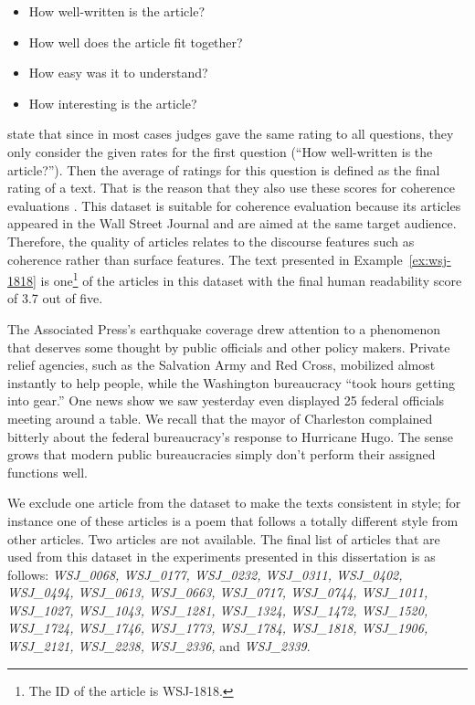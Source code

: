 \begin{itemize}
    \item How well-written is the article?
    \item How well does the article fit together?
    \item How easy was it to understand?
    \item How interesting is the article?
\end{itemize} 
 
 state that since in most cases judges gave the same rating to all questions, they only consider the given rates for the first question (``How well-written is the article?''). 
Then the average of ratings for this question is defined as the final rating of a text. 
That is the reason that they also use these scores for coherence evaluations \cite{pitler08}. 
This dataset is suitable for coherence evaluation because its articles appeared in the Wall Street Journal and are aimed at the same target audience. 
Therefore, the quality of articles relates to the discourse features such as coherence rather than surface features. 
The text presented in Example~\ref{ex:wsj-1818} is one\footnote{The ID of the article is WSJ-1818.} of the articles in this dataset with the final human readability score of 3.7 out of five.  


\begin{examples}
	\label{ex:wsj-1818}
	The Associated Press's earthquake coverage drew attention to a phenomenon that deserves some thought by public officials and other policy makers. 
	Private relief agencies, such as the Salvation Army and Red Cross, mobilized almost instantly to help people, while the Washington bureaucracy ``took hours getting into gear.'' 
	One news show we saw yesterday even displayed 25 federal officials meeting around a table. 
	We recall that the mayor of Charleston complained bitterly about the federal bureaucracy's response to Hurricane Hugo. 
	The sense grows that modern public bureaucracies simply don't perform their assigned functions well. 
\end{examples}

We exclude one article from the dataset to make the texts consistent in style; for instance one of these articles is a poem that follows a totally different style from other articles.  
Two articles are not available. 
The final list of articles that are used from this dataset in the experiments presented in this dissertation is as follows:
\emph{
WSJ\_0068,
WSJ\_0177,
WSJ\_0232,
WSJ\_0311,
WSJ\_0402,
WSJ\_0494,
WSJ\_0613,
WSJ\_0663,
WSJ\_0717,
WSJ\_0744,
WSJ\_1011,
WSJ\_1027,
WSJ\_1043,
WSJ\_1281,
WSJ\_1324,
WSJ\_1472,
WSJ\_1520,
WSJ\_1724,
WSJ\_1746,
WSJ\_1773,
WSJ\_1784,
WSJ\_1818,
WSJ\_1906,
WSJ\_2121,
WSJ\_2238,
WSJ\_2336, } and \emph{WSJ\_2339}. 

